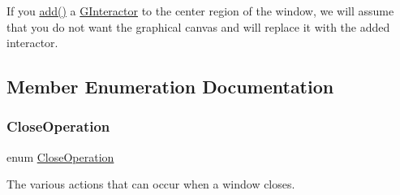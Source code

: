 If you \mbox{\hyperlink{classGWindow_a6f99b7c841256dbdc5acaafbbca4e685}{add()}} a \mbox{\hyperlink{classGInteractor}{G\+Interactor}} to the center region of the window, we will assume that you do not want the graphical canvas and will replace it with the added interactor. 

\subsection{Member Enumeration Documentation}
\mbox{\label{classGWindow_a84803201f0f9569db61f51cac9e0d2d2}} 
\subsubsection{\texorpdfstring{Close\+Operation}{CloseOperation}}
{\footnotesize\ttfamily enum \mbox{\hyperlink{classGWindow_a84803201f0f9569db61f51cac9e0d2d2}{Close\+Operation}}}



The various actions that can occur when a window closes. 

